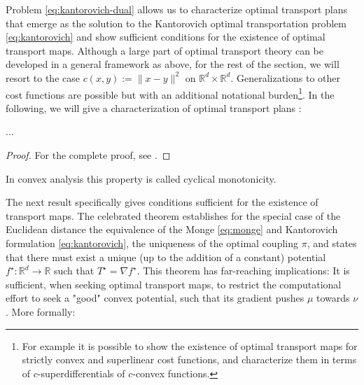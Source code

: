 Problem \eqref{eq:kantorovich-dual} allows us to characterize optimal transport plans that emerge as the solution to the Kantorovich optimal transportation problem \eqref{eq:kantorovich} and show sufficient conditions for the existence of optimal transport maps.
Although a large part of optimal transport theory can be developed in a general framework as above, for the rest of the section, we will resort to the case $c(x, y):=\|x-y\|^2$ on $\mathbb{R}^d \times \mathbb{R}^d$. Generalizations to other cost functions are possible but with an additional notational burden\footnote{For example it is possible to show the existence of optimal transport maps for strictly convex and superlinear cost functions, and characterize them in terms of $c$-superdifferentials of $c$-convex functions.}.
In the following, we will give a characterization of optimal transport plans \citep{knott1984optimal}:

\begin{theorem}
	...
\end{theorem}
\begin{proof}
	For the complete proof, see \citet[Proof of Theorem 2.12]{villani2021topics}.
\end{proof}
In convex analysis this property is called cyclical monotonicity.

The next result specifically gives conditions sufficient for the existence of transport maps.
The celebrated \citeauthor{brenier1987decomposition} theorem \citeyearpar{brenier1987decomposition} establishes for the special case of the Euclidean distance the equivalence of the Monge \eqref{eq:monge} and Kantorovich formulation  \eqref{eq:kantorovich}, the uniqueness of the optimal coupling $\pi$, and states that there must exist a unique (up to the addition of a constant) potential $f^\star:\mathbb{R}^d\rightarrow \mathbb{R}$ such that $T^\star = \nabla f^\star$. 
This theorem has far-reaching implications: It is sufficient, when seeking optimal transport maps, to restrict the computational effort to seek a "good" convex potential, such that its gradient pushes $\mu$ towards $\nu$. 
More formally:


